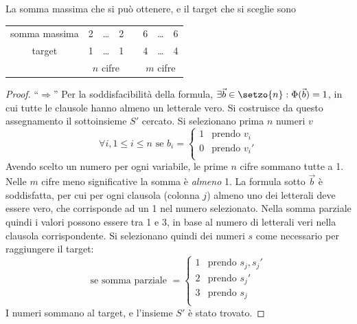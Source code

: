 La somma massima che si può ottenere, e il target che si sceglie sono
\begin{center}
    \begin{tabular}[h]{*{8}{c}}
       \cline{2-8}
       somma massima & 2 & \ldots & 2 & \vline & 6 & \ldots  & 6  \\
       target        & 1 & \ldots & 1 & \vline & 4 & \ldots  & 4  \\
       \cline{2-8}
                     & \multicolumn{3}{c}{$n$ cifre}
                                      &\vline  & \multicolumn{3}{c}{$m$ cifre}
    \end{tabular}
\end{center}
\begin{proof}
    ``$\Rightarrow$''
    Per la soddisfacibilità della formula, 
    $ \exists \vec{b} \in \setzo{n} : \Phi ( \vec{b} ) = 1 $,
    in cui tutte le clausole hanno almeno un letterale vero.
    Si costruisce da questo assegnamento il sottoinsieme $S'$ cercato.
    Si selezionano prima $n$ numeri $v$
    \begin{equation*}
        \forall i, 1 \le i \le n \text{ se }
        b_i = 
        \begin{cases}
            1 & \text{prendo } v_i \\
            0 & \text{prendo } v_i' \\
        \end{cases}
    \end{equation*}
    Avendo scelto un numero per ogni variabile, le prime $n$ cifre sommano tutte a 1.
    Nelle $m$ cifre meno significative la somma è \emph{almeno} 1. La formula sotto $\vec{b}$ è soddisfatta, per cui per ogni clausola (colonna $j$) almeno uno dei letterali deve essere vero, che corrisponde ad un 1 nel numero selezionato.
    Nella somma parziale quindi i valori possono essere tra 1 e 3, in base al numero di letterali veri nella clausola corrispondente.
    Si selezionano quindi dei numeri $s$ come necessario per raggiungere il target:
    \begin{equation*}
        \text{se somma parziale }
         = 
        \begin{cases}
            1 & \text{prendo } s_j, s_j' \\
            2 & \text{prendo } s_j' \\
            3 & \text{prendo } s_j \\
        \end{cases}
    \end{equation*}
    I numeri sommano al target, e l'insieme $S'$ è stato trovato.
    

\end{proof}
